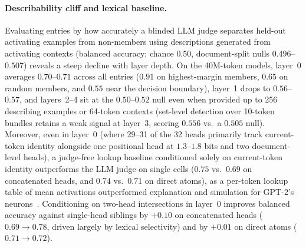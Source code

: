 \paragraph{Describability cliff and lexical baseline.} Evaluating entries by
how accurately a blinded LLM judge separates held-out activating examples
from non-members using descriptions generated from activating contexts
(balanced accuracy; chance $0.50$, document-split nulls $0.496$--$0.507$)
reveals a steep decline with layer depth. On the 40M-token models, layer~0
averages $0.70$--$0.71$ across all entries ($0.91$ on highest-margin
members, $0.65$ on random members, and $0.55$ near the decision boundary),
layer~1 drops to $0.56$--$0.57$, and layers~2--4 sit at the $0.50$--$0.52$
null even when provided up to 256 describing examples or 64-token contexts
(set-level detection over 10-token bundles retains a weak signal at layer~3,
scoring $0.556$ vs.\ a $0.505$ null). Moreover, even in layer~0 (where
29--31 of the 32 heads primarily track current-token identity alongside one
positional head at $1.3$--$1.8$ bits and two document-level heads), a
judge-free lookup baseline conditioned solely on current-token identity
outperforms the LLM judge on single cells ($0.75$ vs.\ $0.69$ on
concatenated heads, and $0.74$ vs.\ $0.71$ on direct atoms), as a
per-token lookup table of mean activations outperformed explanation and
simulation for GPT-2's neurons~\cite{bills2023}. Conditioning on
two-head intersections in layer~0 improves balanced accuracy against
single-head siblings by $+0.10$ on concatenated heads ($0.69 \to 0.78$,
driven largely by lexical selectivity) and by $+0.01$ on direct atoms
($0.71 \to 0.72$).

